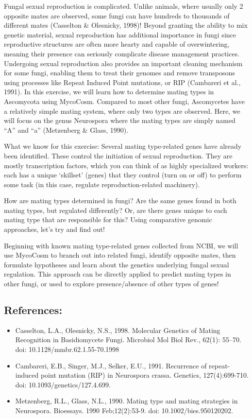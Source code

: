\documentclass[
  letterpaper,
  DIV=11,
  numbers=noendperiod]{scrreprt}
\providecommand{\tightlist}{%
  \setlength{\itemsep}{0pt}\setlength{\parskip}{0pt}}
\begin{document}
Fungal sexual reproduction is complicated. Unlike animals, where usually
only 2 opposite mates are observed, some fungi can have hundreds to
thousands of different mates (Casselton \& Olesnicky, 1998)! Beyond
granting the ability to mix genetic material, sexual reproduction has
additional importance in fungi since reproductive structures are often
more hearty and capable of overwintering, meaning their presence can
seriously complicate disease management practices. Undergoing sexual
reproduction also provides an important cleaning mechanism for some
fungi, enabling them to treat their genomes and remove transposons using
processes like Repeat Induced Point mutations, or RIP (Cambareri et al.,
1991). In this exercise, we will learn how to determine mating types in
Ascomycota using MycoCosm. Compared to most other fungi, Ascomycetes
have a relatively simple mating system, where only two types are
observed. Here, we will focus on the genus Neurospora where the mating
types are simply named ``A'' and ``a'' (Metzenberg \& Glass, 1990).

What we know for this exercise: Several mating type-related genes have
already been identified. These control the initiation of sexual
reproduction. They are mostly transcription factors, which you can think
of as highly specialized workers: each has a unique `skillset' (genes)
that they control (turn on or off) to perform some task (in this case,
regulate reproduction-related machinery).

How are mating types determined in fungi? Are the same genes found in
both mating types, but regulated differently? Or, are there genes unique
to each mating type that are responsible for this? Using comparative
genomic approaches, let's try and find out!

Beginning with known mating type-related genes collected from NCBI, we
will use MycoCosm to branch out into related fungi, identify opposite
mates, then formulate hypotheses and learn about the genetics underlying
fungal sexual regulation. This approach can be directly applied to
predict mating types in other fungi, or used to explore presence/absence
of other types of genes!

\subsection*{References:}\label{references}

\begin{itemize}
\tightlist
\item
  Casselton, L.A., Olesnicky, N.S., 1998. Molecular Genetics of Mating
  Recognition in Basidiomycete Fungi. Microbiol Mol Biol Rev., 62(1):
  55--70. doi: 10.1128/mmbr.62.1.55-70.1998
\item
  Cambareri, E.B., Singer, M.J., Selker, E.U., 1991. Recurrence of
  repeat-induced point mutation (RIP) in Neurospora crassa. Genetics,
  127(4):699-710. doi: 10.1093/genetics/127.4.699.
\item
  Metzenberg, R.L., Glass, N.L., 1990. Mating type and mating strategies
  in Neurospora. Bioessays. 1990 Feb;12(2):53-9. doi:
  10.1002/bies.950120202.
\end{itemize}
\end{document}
